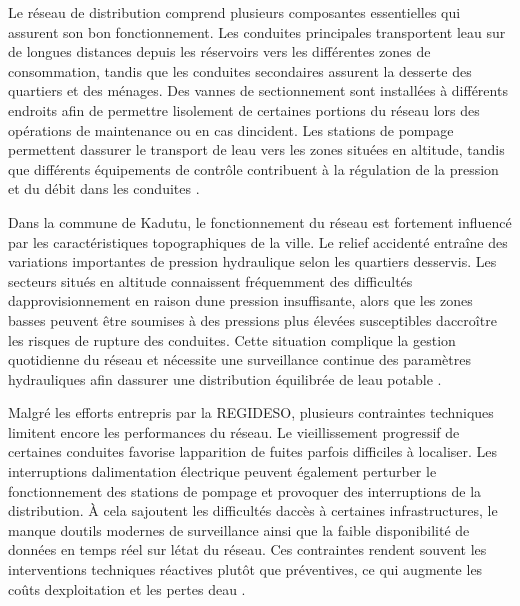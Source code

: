 \documentclass[12pt,a4paper,oneside]{report}
\begin{document}
Le réseau de distribution comprend plusieurs composantes essentielles
qui assurent son bon fonctionnement. Les conduites principales
transportent l\textquotesingle eau sur de longues distances depuis les
réservoirs vers les différentes zones de consommation, tandis que les
conduites secondaires assurent la desserte des quartiers et des ménages.
Des vannes de sectionnement sont installées à différents endroits afin
de permettre l\textquotesingle isolement de certaines portions du réseau
lors des opérations de maintenance ou en cas d\textquotesingle incident.
Les stations de pompage permettent d\textquotesingle assurer le
transport de l\textquotesingle eau vers les zones situées en altitude,
tandis que différents équipements de contrôle contribuent à la
régulation de la pression et du débit dans les conduites \cite{ref90}.

Dans la commune de Kadutu, le fonctionnement du réseau est fortement
influencé par les caractéristiques topographiques de la ville. Le relief
accidenté entraîne des variations importantes de pression hydraulique
selon les quartiers desservis. Les secteurs situés en altitude
connaissent fréquemment des difficultés
d\textquotesingle approvisionnement en raison d\textquotesingle une
pression insuffisante, alors que les zones basses peuvent être soumises
à des pressions plus élevées susceptibles d\textquotesingle accroître
les risques de rupture des conduites. Cette situation complique la
gestion quotidienne du réseau et nécessite une surveillance continue des
paramètres hydrauliques afin d\textquotesingle assurer une distribution
équilibrée de l\textquotesingle eau potable \cite{ref34}.

Malgré les efforts entrepris par la REGIDESO, plusieurs contraintes
techniques limitent encore les performances du réseau. Le vieillissement
progressif de certaines conduites favorise l\textquotesingle apparition
de fuites parfois difficiles à localiser. Les interruptions
d\textquotesingle alimentation électrique peuvent également perturber le
fonctionnement des stations de pompage et provoquer des interruptions de
la distribution. À cela s\textquotesingle ajoutent les difficultés
d\textquotesingle accès à certaines infrastructures, le manque
d\textquotesingle outils modernes de surveillance ainsi que la faible
disponibilité de données en temps réel sur l\textquotesingle état du
réseau. Ces contraintes rendent souvent les interventions techniques
réactives plutôt que préventives, ce qui augmente les coûts
d\textquotesingle exploitation et les pertes d\textquotesingle eau
\cite{ref92}.
\end{document}
